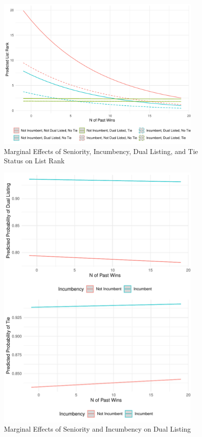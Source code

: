 \documentclass[a4paper, 11pt]{article}
\begin{document}



\begin{figure}[!htbp]
	\includegraphics[width = 0.9\textwidth]{../figure/paper/marginal_effects_rank.pdf}
	\caption{Marginal Effects of Seniority, Incumbency, Dual Listing, and Tie Status on List Rank}
	\label{fig:marginal_rank}
\end{figure}

\begin{figure}[!htbp]
	\includegraphics[width = 0.9\textwidth]{../figure/paper/marginal_effects_dual_tie.pdf}
	\caption{Marginal Effects of Seniority and Incumbency on Dual Listing}
	\label{fig:marginal_dual}
\end{figure}
\end{document}
